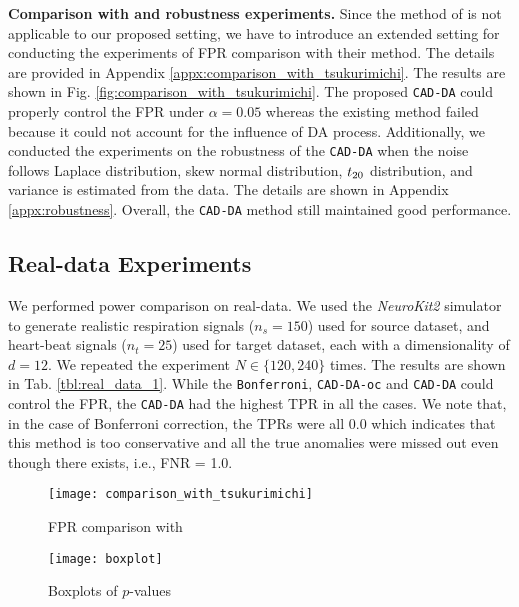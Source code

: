\textbf{Comparison with \cite{tsukurimichi2022conditional} and robustness experiments.}
%
Since the method of \cite{tsukurimichi2022conditional} is not applicable to our proposed setting, we have to introduce an extended setting for conducting the experiments of FPR comparison with their method.
%
The details are provided in Appendix \ref{appx:comparison_with_tsukurimichi}.
%
The results are shown in Fig. \ref{fig:comparison_with_tsukurimichi}.
%
The proposed {\tt CAD-DA} could properly control the FPR under $\alpha = 0.05$ whereas the existing method \cite{tsukurimichi2022conditional} failed because it could not account for the influence of DA process.
%
Additionally, we conducted the experiments on the robustness of the {\tt CAD-DA} when the noise follows Laplace distribution, skew normal distribution, $t_{\rm 20}$ distribution, and variance is estimated from the data. 
%
The details are shown in Appendix \ref{appx:robustness}.
%
Overall, the {\tt CAD-DA} method still maintained good performance.

\vspace{-4pt}

\subsection{Real-data Experiments}

\vspace{-2pt}

We performed power comparison on real-data.
%
We used the \emph{NeuroKit2} simulator \cite{Makowski2021neurokit} to generate realistic respiration signals ($n_s = 150$) used for source dataset, and heart-beat signals ($n_t = 25$) used for target dataset, each with a dimensionality of $d = 12$.
%
We repeated the experiment $N \in \{ 120, 240\} $ times.
%
The results are shown in Tab. \ref{tbl:real_data_1}.
%
While the {\tt Bonferroni}, {\tt CAD-DA-oc} and {\tt CAD-DA} could control the FPR, the {\tt CAD-DA} had the highest TPR in all the cases.
%
We note that, in the case of Bonferroni correction, the TPRs were all 0.0 which indicates that this method is too conservative and all the true anomalies were missed out even though there exists, i.e., FNR = 1.0.


\begin{figure}[!t]
\begin{minipage}{0.48\linewidth}
  \centering
  \texttt{[image: comparison\_with\_tsukurimichi]}  
\caption{FPR comparison with \cite{tsukurimichi2022conditional}}
\label{fig:comparison_with_tsukurimichi}
\end{minipage}
\hspace{0.5mm}
\begin{minipage}{0.48\linewidth}
  \centering
  \texttt{[image: boxplot]}  
\caption{Boxplots of $p$-values}
\label{fig:boxplot}
\end{minipage}
\end{figure}


